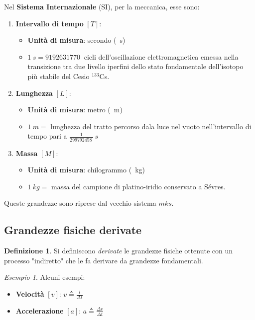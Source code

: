 \documentclass[a4paper, 12pt]{report}
\theoremstyle{definition}
\newtheorem{definition}{Definizione}[section]
\theoremstyle{remark}
\newtheorem*{example}{Esempio}
\theoremstyle{plain}
\begin{document}
Nel {\bf Sistema Internazionale} (SI), per la meccanica, esse sono:
\begin{enumerate}
    \item {\bf Intervallo di tempo} $[T]$:
        \begin{itemize}
            \item {\bf Unità di misura}: secondo (\SI{}{s})
            \item $\SI{1}{s} = \SI{9192631770}{}$ cicli dell'oscillazione elettromagnetica emessa nella transizione tra due livello iperfini dello stato fondamentale dell'isotopo più stabile del Cesio ${}^{133}$Cs.
        \end{itemize}
    \item {\bf Lunghezza} $[L]$:
        \begin{itemize}
            \item {\bf Unità di misura}: metro (\SI{}{m})
            \item $\SI{1}{m} = $ lunghezza del tratto percorso dala luce nel vuoto nell'intervallo di tempo pari a $\frac{1}{\SI{299792458}{}}\SI{}{s}$
        \end{itemize}
    \item {\bf Massa} $[M]$:
    \begin{itemize}
        \item {\bf Unità di misura}: chilogrammo (\SI{}{kg})
        \item $\SI{1}{kg} = $ massa del campione di platino-iridio conservato a Sévres.
    \end{itemize}
\end{enumerate}

Queste grandezze sono riprese dal vecchio sistema $mks$.

\subsection{Grandezze fisiche derivate}

\begin{definition}
    Si definiscono {\it derivate} le grandezze fisiche ottenute con un processo "indiretto" che le fa derivare da grandezze fondamentali.
\end{definition}

\begin{example}
    Alcuni esempi:
    \begin{itemize}
        \item {\bf Velocità} $[v]$: $v \triangleq \frac{l}{\Delta t}$
        \item {\bf Accelerazione} $[a]$: $a \triangleq \frac{\Delta v}{\Delta t}$
    \end{itemize}
\end{example}
\end{document}
